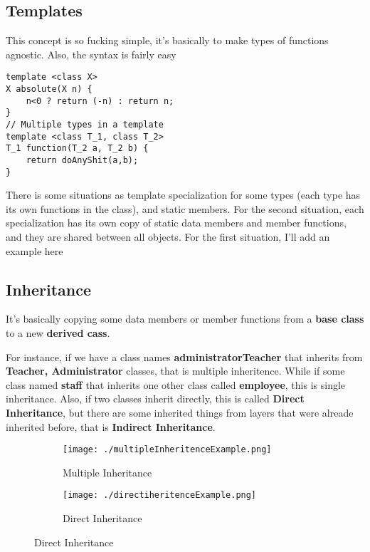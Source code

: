 \documentclass{article}
\begin{document}
\subsection{Templates}

This concept is so fucking simple, it's basically to make types of functions agnostic. Also, the syntax is fairly easy

\begin{lstlisting}
template <class X>
X absolute(X n) {
	n<0 ? return (-n) : return n;
}
// Multiple types in a template
template <class T_1, class T_2>
T_1 function(T_2 a, T_2 b) {
	return doAnyShit(a,b);
}
\end{lstlisting}

There is some situations as template specialization for some types (each type has its own functions in the class), and static members. For the second situation, each specialization has its own copy of static data members and member functions, and they are shared between all objects. For the first situation, I'll add an example here

\newpage	

\subsection{Inheritance}
It's basically copying some data members or member functions from a \textbf{base class} to a new \textbf{derived cass}. 

For instance, if we have a class names \textbf{administratorTeacher} that inherits from \textbf{Teacher, Administrator} classes, that is multiple inheritence. While if some class named \textbf{staff} that inherits one other class called \textbf{employee}, this is single inheritance. Also, if two classes inherit directly, this is called \textbf{Direct Inheritance}, but there are some inherited things from layers that were alreade inherited before, that is \textbf{Indirect Inheritance}.

\begin{figure}[h]
	\begin{subfigure}[b]{0.5\linewidth}
			\texttt{[image: ./multipleInheritenceExample.png]}
			\caption{Multiple Inheritance}
			\label{inherit:tokhy_1}
		\end{subfigure}
		\begin{subfigure}[b]{0.4\linewidth}
			\texttt{[image: ./directiheritenceExample.png]}
			\caption{Direct Inheritance}
			\label{inherit:tokhy_2}
		\end{subfigure}
			
\end{figure}
\end{document}
